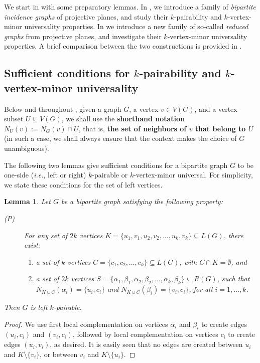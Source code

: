 \documentclass[10pt,a4paper]{article}
\newtheorem{lemma}{Lemma}[section]
\begin{document}
We start in  with some preparatory lemmas.  In , we introduce a family of  \emph{bipartite incidence graphs} of projective planes, and study their  $k$-pairability and $k$-vertex-minor universality properties. In  we introduce a new family of so-called \emph{reduced graphs} from projective planes, and investigate their $k$-vertex-minor universality properties. A brief comparison between the two constructions is provided in .

\subsection{Sufficient conditions for $k$-pairability and $k$-vertex-minor universality}
\label{subsec:lemmas-k-pairability-vmu}

Below and throughout , given a graph $G$, a vertex $v\in V(G)$, and a vertex subset $U\subseteq V(G)$, we shall use the \textbf{shorthand notation} $N_U(v) := N_G(v) \cap U$, that is,  \textbf{the set of neighbors of $v$ that belong to $U$} (in such a case, we shall always ensure that the context makes the choice of $G$ unambiguous). 

The following two lemmas give sufficient conditions for a bipartite graph $G$ to be one-side (\emph{i.e.}, left or right) $k$-pairable or $k$-vertex-minor universal. For simplicity, we state these conditions for the set of left vertices.  
	
\begin{lemma}\label{lemma:Pcondition}
    Let $G$ be a bipartite graph satisfying the following property:
    \begin{description}
        \item[{\rm\em (P)}] For any set of $2k$  vertices $K = \{u_1,v_1, u_2,v_2, \dots, u_k, v_k\} \subseteq L(G)$, there exist:
              \begin{enumerate}
                  \item  a set of $k$  vertices $C = \{c_1, c_2,\dots, c_k \} \subseteq L(G)$, with  $C\cap K = \emptyset$, and
                  \item  a  set of $2k$  vertices $S = \{\alpha_1,\beta_1, \alpha_2,\beta_2, \dots, \alpha_k, \beta_k\} \subseteq R(G)$, such that $N_{K \cup C} (\alpha_i) = \{u_i, c_i\}$ and $N_{K \cup C} (\beta_i) = \{v_i, c_i\}$, for all $i=1,\dots,k$.
              \end{enumerate}
    \end{description}
    Then $G$ is left $k$-pairable.
\end{lemma}
\begin{proof}
    We  use  first local complementation on vertices $\alpha_i$ and $\beta_i$ to create edges $(u_i, c_i)$ and $(v_i, c_i)$, followed by local complementation on vertices $c_i$ to create edges $(u_i, v_i)$, as desired. It is easily seen that no edges are created between $u_i$ and $K\setminus\{v_i\}$, or between $v_i$ and $K\setminus\{u_i\}$.
\end{proof}
\end{document}
